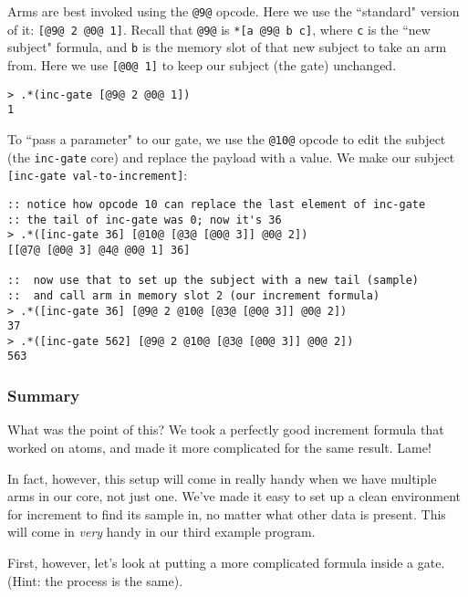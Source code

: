 \documentclass[twoside]{article}
\begin{document}
Arms are best invoked using the \lstinline[style=inlinecode]{@9@} opcode. Here we use the ``standard" version of it: \lstinline[style=inlinecode]{[@9@ 2 @0@ 1]}. Recall that \lstinline[style=inlinecode]{@9@} is \lstinline[style=inlinecode]{*[a @9@ b c]}, where \lstinline[style=inlinecode]{c} is the ``new subject" formula, and \lstinline[style=inlinecode]{b} is the memory slot of that new subject to take an arm from. Here we use \lstinline[style=inlinecode]{[@0@ 1]} to keep our subject (the gate) unchanged.

\begin{lstlisting}[style=listingcode]
> .*(inc-gate [@9@ 2 @0@ 1])
1
\end{lstlisting}

To ``pass a parameter" to our gate, we use the \lstinline[style=inlinecode]{@10@} opcode to edit the subject (the \lstinline[style=inlinecode]{inc-gate} core) and replace the payload with a value.  We make our subject \lstinline[style=inlinecode]{[inc-gate val-to-increment]}:

\begin{lstlisting}[style=listingcode]
:: notice how opcode 10 can replace the last element of inc-gate
:: the tail of inc-gate was 0; now it's 36
> .*([inc-gate 36] [@10@ [@3@ [@0@ 3]] @0@ 2])
[[@7@ [@0@ 3] @4@ @0@ 1] 36]

::  now use that to set up the subject with a new tail (sample)
::  and call arm in memory slot 2 (our increment formula)
> .*([inc-gate 36] [@9@ 2 @10@ [@3@ [@0@ 3]] @0@ 2])
37
> .*([inc-gate 562] [@9@ 2 @10@ [@3@ [@0@ 3]] @0@ 2])
563
\end{lstlisting}

\subsubsection{Summary}

What was the point of this? We took a perfectly good increment formula that worked on atoms, and made it more complicated for the same result. Lame!

In fact, however, this setup will come in really handy when we have multiple arms in our core, not just one. We've made it easy to set up a clean environment for increment to find its sample in, no matter what other data is present. This will come in \emph{very} handy in our third example program.

First, however, let's look at putting a more complicated formula inside a gate. (Hint: the process is the same).
\end{document}

